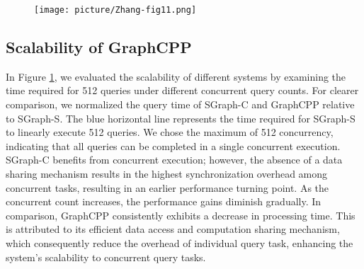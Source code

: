 \documentclass[10pt,journal,compsoc]{IEEEtran}
\begin{document}
\begin{figure}[t]
    \centering
    \texttt{[image: picture/Zhang-fig11.png]}
    \captionsetup{labelsep=period}
    \caption{}
    \label{fig11}
    \vspace{-0.5cm}
\end{figure}

\vspace{-8pt}
\subsection{Scalability of GraphCPP}
\vspace{-4pt}
In Figure \ref{fig11}, we evaluated the scalability of different systems by examining the time required for 512 queries under different concurrent query counts.
For clearer comparison, we normalized the query time of SGraph-C and GraphCPP relative to SGraph-S. The blue horizontal line represents the time required for SGraph-S to linearly execute 512 queries.
We chose the maximum of 512 concurrency, indicating that all queries can be completed in a single concurrent execution.
SGraph-C benefits from concurrent execution; however, the absence of a data sharing mechanism results in the highest synchronization overhead among concurrent tasks, resulting in an earlier performance turning point. As the concurrent count increases, the performance gains diminish gradually.
In comparison, GraphCPP consistently exhibits a decrease in processing time. This is attributed to its efficient data access and computation sharing mechanism, which consequently reduce the overhead of individual query task, enhancing the system's scalability to concurrent query tasks.


\vspace{-8pt}
\end{document}
